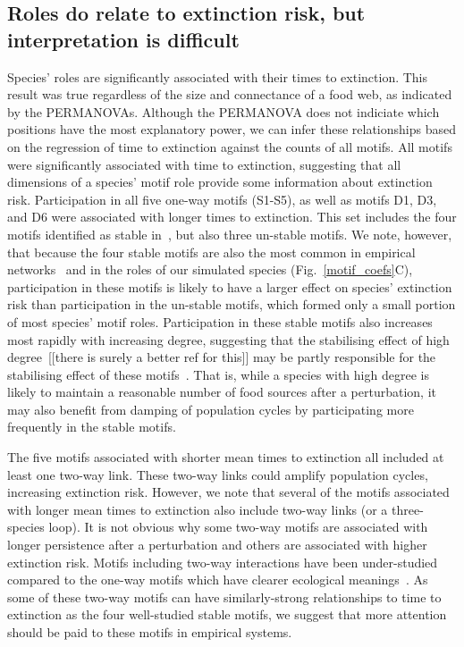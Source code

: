 \documentclass[12pt]{article}
\begin{document}
	\subsection*{Roles do relate to extinction risk, but interpretation is difficult}

	    Species' roles are significantly associated with their times to extinction. This result was true regardless of the size and connectance of a food web, as indicated by the PERMANOVAs.
		Although the PERMANOVA does not indiciate which positions have the most explanatory power, we can infer these relationships based on the regression of time to extinction against the counts of all motifs.
		All motifs were significantly associated with time to extinction, suggesting that all dimensions of a species' motif role provide some information about extinction risk.
		Participation in all five one-way motifs (S1-S5), as well as motifs D1, D3, and D6 were associated with longer times to extinction. 
		This set includes the four motifs identified as stable in~\citet{Stouffer2007,Borrelli2015a}, but also three un-stable motifs. 
		We note, however, that because the four stable motifs are also the most common in empirical networks~\citep{Stouffer2007} and in the roles of our simulated species (Fig.~\ref{motif_coefs}C), participation in these motifs is likely to have a larger effect on species' extinction risk than participation in the un-stable motifs, which formed only a small portion of most species' motif roles.
		Participation in these stable motifs also increases most rapidly with increasing degree, suggesting that the stabilising effect of high degree~\citep{Cirtwill2016a}[[there is surely a better ref for this]] may be partly responsible for the stabilising effect of these motifs~\citep{Stouffer2007,Borrelli2015a}.
		That is, while a species with high degree is likely to maintain a reasonable number of food sources after a perturbation, it may also benefit from damping of population cycles by participating more frequently in the stable motifs.


        The five motifs associated with shorter mean times to extinction all included at least one two-way link. 
        These two-way links could amplify population cycles, increasing extinction risk.
        However, we note that several of the motifs associated with longer mean times to extinction also include two-way links (or a three-species loop).
		It is not obvious why some two-way motifs are associated with longer persistence after a perturbation and others are associated with higher extinction risk.
		Motifs including two-way interactions have been under-studied compared to the one-way motifs which have clearer ecological meanings~\citep{Bascompte2005,Cirtwill2015}.
		As some of these two-way motifs can have similarly-strong relationships to time to extinction as the four well-studied stable motifs, we suggest that more attention should be paid to these motifs in empirical systems.
\end{document}
